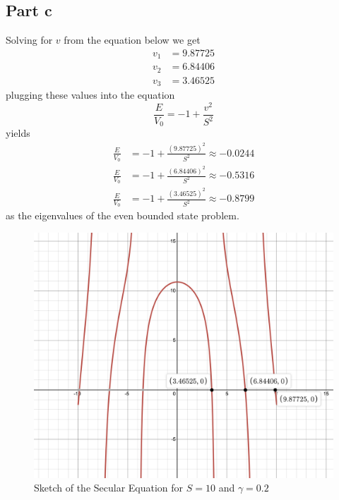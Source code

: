 \documentclass[12pt]{report}
\begin{document}
\subsection*{Part c}
Solving for $v$ from the equation below we get
\begin{align*}
    v_1 &= 9.87725 \\
    v_2 &= 6.84406 \\
    v_3 &= 3.46525 
\end{align*}
plugging these values into the equation
\begin{equation*}
    \frac{E}{V_0} = -1 + \frac{v^2}{S^2} 
\end{equation*}
yields
\begin{align*}
     \frac{E}{V_0} &= -1 + \frac{(9.87725)^2}{S^2} \approx -0.0244\\
      \frac{E}{V_0} &= -1 + \frac{(6.84406)^2}{S^2} \approx -0.5316\\
       \frac{E}{V_0} &= -1 + \frac{(3.46525)^2}{S^2} \approx -0.8799
\end{align*}
as the eigenvalues of the even bounded state problem.
\begin{figure}[H]
    \centering
    \includegraphics[scale=0.4]{Secular_1.png}
    \caption{Sketch of the Secular Equation for $S=10$ and $\gamma = 0.2$}
    \label{fig:enter-label}
  \end{figure}
\end{document}
